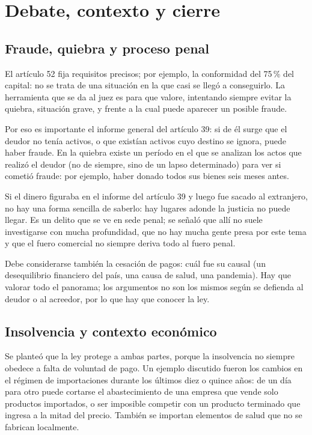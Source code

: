 \documentclass[12pt,oneside]{book}
\begin{document}
\chapter[Debate y cierre]{Debate, contexto y cierre}

\section{Fraude, quiebra y proceso penal}

El artículo 52 fija requisitos precisos; por ejemplo, la conformidad del 75\,\% del capital: no se trata de una situación en la que casi se llegó a conseguirlo. La herramienta que se da al juez es para que valore, intentando siempre evitar la quiebra, situación grave, y frente a la cual puede aparecer un posible fraude.

Por eso es importante el informe general del artículo 39: si de él surge que el deudor no tenía activos, o que existían activos cuyo destino se ignora, puede haber fraude. En la quiebra existe un período en el que se analizan los actos que realizó el deudor (no de siempre, sino de un lapso determinado) para ver si cometió fraude: por ejemplo, haber donado todos sus bienes seis meses antes.

Si el dinero figuraba en el informe del artículo 39 y luego fue sacado al extranjero, no hay una forma sencilla de saberlo: hay lugares adonde la justicia no puede llegar. Es un delito que se ve en sede penal; se señaló que allí no suele investigarse con mucha profundidad, que no hay mucha gente presa por este tema y que el fuero comercial no siempre deriva todo al fuero penal.

Debe considerarse también la cesación de pagos: cuál fue su causal (un desequilibrio financiero del país, una causa de salud, una pandemia). Hay que valorar todo el panorama; los argumentos no son los mismos según se defienda al deudor o al acreedor, por lo que hay que conocer la ley.

\section{Insolvencia y contexto económico}

Se planteó que la ley protege a ambas partes, porque la insolvencia no siempre obedece a falta de voluntad de pago. Un ejemplo discutido fueron los cambios en el régimen de importaciones durante los últimos diez o quince años: de un día para otro puede cortarse el abastecimiento de una empresa que vende solo productos importados, o ser imposible competir con un producto terminado que ingresa a la mitad del precio. También se importan elementos de salud que no se fabrican localmente.
\end{document}
